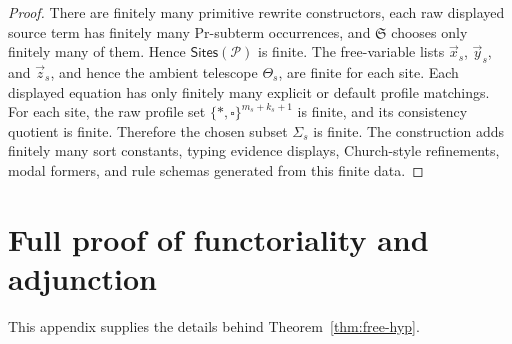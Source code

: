 \documentclass[11pt]{article}
\newcommand{\Proc}{\mathrm{Pr}}
\newcommand{\Sites}{\mathsf{Sites}}
\newcommand{\Sig}{\Sigma}
\begin{document}
\begin{proof}
There are finitely many primitive rewrite constructors, each raw displayed source term has finitely many \(\Proc\)-subterm occurrences, and \(\mathfrak{S}\) chooses only finitely many of them. Hence \(\Sites(\mathcal{P})\) is finite. The free-variable lists \(\vec{x}_s\), \(\vec{y}_s\), and \(\vec{z}_s\), and hence the ambient telescope \(\Theta_s\), are finite for each site. Each displayed equation has only finitely many explicit or default profile matchings. For each site, the raw profile set \(\{\ast,\square\}^{m_s+k_s+1}\) is finite, and its consistency quotient is finite. Therefore the chosen subset \(\Sig_s\) is finite. The construction adds finitely many sort constants, typing evidence displays, Church-style refinements, modal formers, and rule schemas generated from this finite data.
\end{proof}



\section{Full proof of functoriality and adjunction}
\label{app:functoriality-adjunction}
This appendix supplies the details behind Theorem~\ref{thm:free-hyp}.
\end{document}

